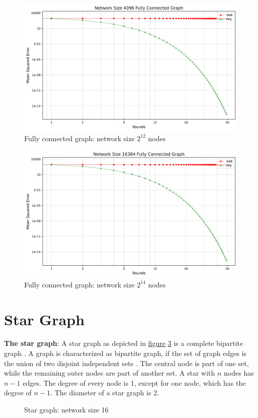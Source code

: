 \begin{figure}[H]
    \centering
    \includegraphics[scale=0.5]{figures/completeGraphSimulations/DAB_vs_PPS_FCG_r50_n4096.png}
    \caption{Fully connected graph: network size $2^{12}$ nodes}
    \label{fig:4096CompleteGraph}
\end{figure}
\begin{figure}[H]
    \centering
    \includegraphics[scale=0.5]{figures/completeGraphSimulations/DAB_vs_PPS_FCG_r50_n16384.png}
    \caption{Fully connected graph: network size $2^{14}$ nodes}
    \label{fig:16384CompleteGraph}
\end{figure}


\section{Star Graph}
\textbf{The star graph}: A star graph as depicted in \hyperref[fig:stargraphDemo]{figure} \ref{fig:stargraphDemo} is a complete bipartite graph \cite{west2001introduction}. A graph is characterized as bipartite graph, if the set of graph edges is the union of two disjoint independent sets \cite{GraphTheorySchindelhaauer2021}. The central node is part of one set, while the remaining outer nodes are part of another set. A star with $n$ nodes has $n-1$ edges. The degree of every node is 1, except for one node, which has the degree of $n-1$. The diameter of a star graph is 2.
\begin{figure}[H]
    \centering
    
    \caption{Star graph: network size 16}
    \label{fig:stargraphDemo}
\end{figure}
